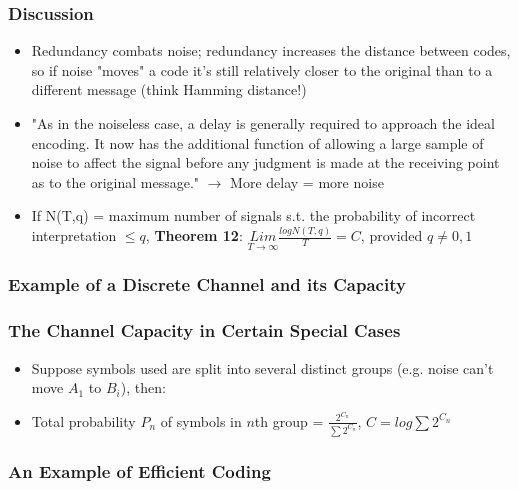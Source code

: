 \documentclass[leqno,twocolumn]{article}
\begin{document}
\subsubsection{Discussion}
\begin{itemize}
\item Redundancy combats noise; redundancy increases the distance between codes, so if noise "moves" a code it's still relatively closer to the original than to a different message (think Hamming distance!)
\item "As in the noiseless case, a delay is generally required to approach the ideal encoding. It now has the additional function of allowing a large sample of noise to affect the signal before any judgment is made at the receiving point as to the original message." $\rightarrow$ More delay = more noise
\item If N(T,q) = maximum number of signals s.t. the probability of incorrect interpretation $\leq q$, \textbf{Theorem 12}: $\underset{T \rightarrow \infty}{Lim} \frac{logN(T,q)}{T} = C$, provided $q \neq 0, 1$
\end{itemize}

\subsubsection{Example of a Discrete Channel and its Capacity}

\subsubsection{The Channel Capacity in Certain Special Cases}
\begin{itemize}
\item Suppose symbols used are split into several distinct groups (e.g. noise can't move $A_1$ to $B_i$), then:
\item Total probability $P_n$ of symbols in $n$th group = $\frac{2^{C_n}}{\sum 2^{C_n}}$, $C = log \sum 2^{C_n}$
\end{itemize}

\subsubsection{An Example of Efficient Coding}
\end{document}
